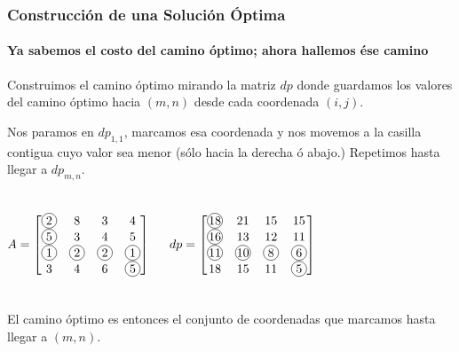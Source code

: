 \documentclass[spanish]{beamer}
\newcommand*\circledcolor[2]{\tikz[baseline=(char.base)]{
    \node[shape=circle,draw,inner sep=1pt,color=#2] (char) {\hphantom{00}};
    \node[inner sep=1pt] (char) {#1};
}}
\newcommand*\circled[1]{\circledcolor{#1}{black}}
\begin{document}
    \begin{frame}
        \frametitle{Construcción de una Solución Óptima}
        \framesubtitle{Ya sabemos el costo del camino óptimo; ahora hallemos ése camino}

        Construimos el camino óptimo mirando la matriz $dp$ donde guardamos los valores del camino óptimo hacia $(m, n)$ desde cada coordenada $(i, j)$.

        \vspace{1em}

        Nos paramos en $dp_{1,1}$, marcamos esa coordenada y nos movemos a la casilla contigua cuyo valor sea menor (sólo hacia la derecha ó abajo.) Repetimos hasta llegar a $dp_{m,n}$.

        \begin{columns}
            $$
            A =
            \begin{bmatrix}
                \circled{2} & 8           & 3           & 4 \\
                \circled{5} & 3           & 4           & 5 \\
                \circled{1} & \circled{2} & \circled{2} & \circled{1} \\
                3           & 4           & 6           & \circled{5}
            \end{bmatrix}
            $$

            $$
            dp =
            \begin{bmatrix}
                \circled{18} & 21           & 15          & 15 \\
                \circled{16} & 13           & 12          & 11 \\
                \circled{11} & \circled{10} & \circled{8} & \circled{6} \\
                18           & 15           & 11          & \circled{5}
            \end{bmatrix}
            $$
        \end{columns}

        \vspace{1em}

        El camino óptimo es entonces el conjunto de coordenadas que marcamos hasta llegar a $(m, n)$.
    \end{frame}
\end{document}
